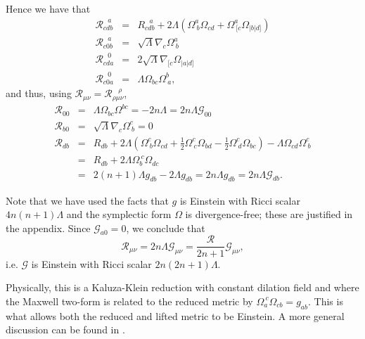 Hence we have that
\begin{eqnarray*}
\mathcal{R}_{cdb}^{\ \ \ a} & = & R_{cdb}^{\ \ \ a}+2\Lambda(\Omega_{\ b}^{a}\Omega_{cd}+\Omega_{\ [c}^{a}\Omega_{|b|d]})\\
\mathcal{R}_{c0b}^{\ \ \ a} & = & \sqrt{\Lambda}\nabla_{c}\Omega_{\ b}^{a}\\
\mathcal{R}_{cda}^{\ \ \ 0} & = & 2\sqrt{\Lambda}\nabla_{[c}\Omega_{|a|d]}\\
\mathcal{R}_{c0a}^{\ \ \ 0} & = & \Lambda\Omega_{bc}\Omega_{\ a}^{b},
\end{eqnarray*}
and thus, using $\mathcal{R}_{\mu\nu}=\mathcal{R}_{\rho\mu\nu}^{\ \ \ \ \rho}$,
\begin{eqnarray*}
\mathcal{R}_{00} & = & \Lambda\Omega_{bc}\Omega^{bc}=-2n\Lambda=2n\Lambda\mathcal{G}_{00}\\
\mathcal{R}_{b0} & = & \sqrt{\Lambda}\nabla_{c}\Omega_{\ b}^{c}=0\\
\mathcal{R}_{db} & = & R_{db}+2\Lambda(\Omega_{\ b}^{c}\Omega_{cd}+\frac{1}{2}\Omega_{\ c}^{c}\Omega_{bd}-\frac{1}{2}\Omega_{\ d}^{c}\Omega_{bc})-\Lambda\Omega_{cd}\Omega_{\ b}^{c}\\
 & = & R_{db}+2\Lambda\Omega_{b}^{\ c}\Omega_{dc}\\
 & = & 2(n+1)\Lambda g_{db}-2\Lambda g_{db}=2n\Lambda g_{db}=2n\Lambda\mathcal{G}_{db}.
\end{eqnarray*}


Note that we have used the facts that $g$ is Einstein with Ricci
scalar $4n(n+1)\Lambda$ and the symplectic form $\Omega$ is divergence-free;
these are justified in the appendix. Since $\mathcal{G}_{a0}=0$,
we conclude that
\[
\mathcal{R}_{\mu\nu}=2n\Lambda\mathcal{G}_{\mu\nu}=\frac{\mathcal{R}}{2n+1}\mathcal{G}_{\mu\nu},
\]
i.e. $\mathcal{G}$ is Einstein with Ricci scalar $2n(2n+1)\Lambda$.
\koniec

Physically, this is a Kaluza-Klein reduction with constant dilation
field and where the Maxwell two-form is related to the reduced metric
by $\Omega_{a}^{\ c}\Omega_{cb}=g_{ab}$. This is what allows both
the reduced and lifted metric to be Einstein. A more general discussion
can be found in \cite{Pope}.

